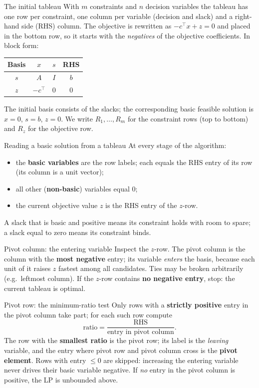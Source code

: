 \begin{rulebox}{The initial tableau}
With $m$ constraints and $n$ decision variables the tableau has one row per
constraint, one column per variable (decision and slack) and a right-hand
side (RHS) column. The objective is rewritten as $-c^{\top}x+z=0$ and placed
in the bottom row, so it starts with the \emph{negatives} of the objective
coefficients. In block form:
\begin{center}
\begin{tabular}{c|cc|c}
Basis & $x$ & $s$ & RHS\\
\hline
$s$ & $A$ & $I$ & $b$\\
\hline
$z$ & $-c^{\top}$ & $0$ & $0$\\
\end{tabular}
\end{center}
The initial basis consists of the slacks; the corresponding
basic feasible solution is $x=0$, $s=b$, $z=0$. We write $R_1,\dots,R_m$
for the constraint rows (top to bottom) and $R_z$ for the objective row.
\end{rulebox}

\begin{rulebox}{Reading a basic solution from a tableau}
At every stage of the algorithm:
\begin{itemize}[leftmargin=1.6em,itemsep=0.3ex]
  \item the \textbf{basic variables} are the row labels; each equals the
        RHS entry of its row (its column is a unit vector);
  \item all other (\textbf{non-basic}) variables equal $0$;
  \item the current objective value $z$ is the RHS entry of the $z$-row.
\end{itemize}
A slack that is basic and positive means its constraint holds with room to
spare; a slack equal to zero means its constraint binds.
\end{rulebox}

\begin{rulebox}{Pivot column: the entering variable}
Inspect the $z$-row. The pivot column is the column with
the \textbf{most negative} entry; its variable \emph{enters} the basis,
because each unit of it raises $z$ fastest among all candidates. Ties may
be broken arbitrarily (e.g.\ leftmost column). If the $z$-row contains
\textbf{no negative entry}, stop: the current tableau is optimal.
\end{rulebox}

\begin{rulebox}{Pivot row: the minimum-ratio test}
Only rows with a \textbf{strictly positive} entry in the pivot column take
part; for each such row compute
\[
  \text{ratio}=\frac{\text{RHS}}{\text{entry in pivot column}} .
\]
The row with the \textbf{smallest ratio} is the pivot row; its label is the \emph{leaving} variable, and the entry
where pivot row and pivot column cross is the \textbf{pivot element}. Rows
with entry $\le 0$ are skipped: increasing the entering variable never
drives their basic variable negative. If \emph{no} entry in the pivot
column is positive, the LP is unbounded above.
\end{rulebox}

